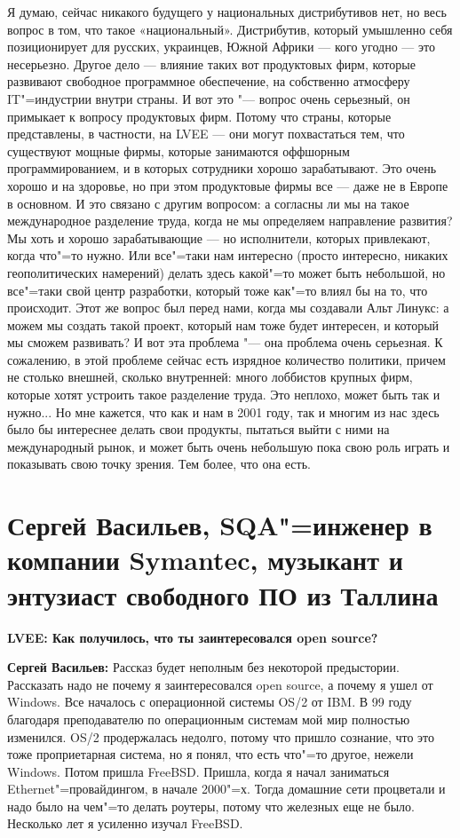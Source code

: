 \documentclass[10pt, a5paper]{article}
\begin{document}
Я думаю, сейчас никакого будущего у национальных дистрибутивов нет, но весь вопрос в том, что такое «национальный». Дистрибутив, который умышленно себя позиционирует для русских, украинцев, Южной Африки — кого угодно — это несерьезно. Другое дело — влияние таких вот продуктовых фирм, которые развивают свободное программное обеспечение, на собственно атмосферу IT"=индустрии внутри страны. И вот это "--- вопрос очень серьезный, он примыкает к вопросу продуктовых фирм. Потому что страны, которые представлены, в частности, на LVEE — они могут похвастаться тем, что существуют мощные фирмы, которые занимаются оффшорным программированием, и в которых сотрудники хорошо зарабатывают. Это очень хорошо и на здоровье, но при этом  продуктовые фирмы все — даже не в Европе в основном. И это связано с другим вопросом: а согласны ли мы на такое международное разделение труда, когда не мы определяем направление развития? Мы хоть и хорошо зарабатывающие — но исполнители, которых привлекают, когда что"=то нужно. Или все"=таки нам интересно (просто интересно, никаких геополитических намерений) делать здесь какой"=то может быть небольшой, но все"=таки свой центр разработки, который тоже как"=то влиял бы на то, что происходит. Этот же вопрос был перед нами, когда мы создавали Альт Линукс: а можем мы создать такой проект, который нам тоже будет интересен, и который мы сможем развивать? И вот эта проблема "--- она проблема очень серьезная. К сожалению, в этой проблеме сейчас есть изрядное количество политики, причем не столько внешней, сколько внутренней: много лоббистов крупных фирм, которые хотят устроить такое разделение труда. Это неплохо, может быть так и нужно... Но мне кажется, что как и нам в 2001 году, так и многим из нас здесь было бы интереснее делать свои продукты, пытаться выйти с ними на международный рынок, и может быть очень небольшую пока свою роль играть и показывать свою точку зрения. Тем более, что она есть. 

\section[Сергей Васильев, Таллин, Эстония]{Сергей Васильев, SQA"=инженер в компании Symantec, музыкант и энтузиаст свободного ПО из Таллина}

{\noindent \bf LVEE: Как получилось, что ты заинтересовался open source?}

{\noindent \bf Сергей Васильев:} Рассказ будет неполным без некоторой предыстории. Рассказать надо не почему я заинтересовался open source, а почему я ушел от Windows. Все началось с операционной системы OS/2 от IBM. В 99 году благодаря преподавателю по операционным системам мой мир полностью изменился. OS/2 продержалась недолго, потому что пришло сознание, что это тоже проприетарная система, но я понял, что есть что"=то другое, нежели Windows. Потом пришла FreeBSD. Пришла, когда я начал заниматься Ethernet"=провайдингом, в начале 2000"=х. Тогда домашние сети процветали и надо было на чем"=то делать роутеры, потому что железных еще не было. Несколько лет я усиленно изучал FreeBSD.
\end{document}

